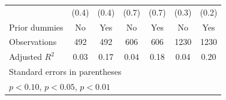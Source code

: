 {\begin{tabular}{l*{6}{c}}
                &    (0.4)         &    (0.4)         &    (0.7)         &    (0.7)         &    (0.3)         &    (0.2)         \\
Prior dummies   &       No         &      Yes         &       No         &      Yes         &       No         &      Yes         \\
\hline
Observations    &      492         &      492         &      606         &      606         &     1230         &     1230         \\
Adjusted \(R^{2}\)&     0.03         &     0.17         &     0.04         &     0.18         &     0.04         &     0.20         \\
\hline\hline
\multicolumn{7}{l}{\footnotesize Standard errors in parentheses}\\
\multicolumn{7}{l}{\footnotesize \sym{*} \(p<0.10\), \sym{**} \(p<0.05\), \sym{***} \(p<0.01\)}\\
\end{tabular}
}
